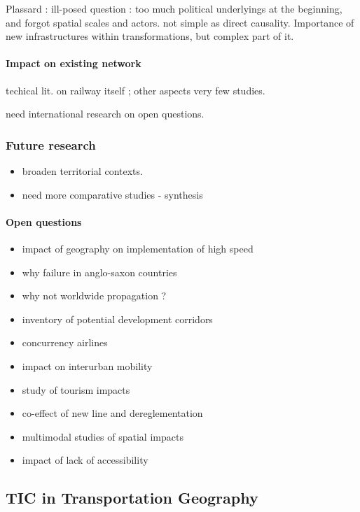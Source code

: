 Plassard : ill-posed question : too much political underlyings at the beginning, and forgot spatial scales and actors. not simple as direct causality. Importance of new infrastructures within transformations, but complex part of it.

\paragraph{Impact on existing network}

techical lit. on railway itself ; other aspects very few studies.

need international research on open questions.

\subsubsection{Future research}

\begin{itemize}
\item broaden territorial contexts.
\item need more comparative studies - synthesis
\end{itemize}

\paragraph{Open questions}

\begin{itemize}
\item impact of geography on implementation of high speed
\item why failure in anglo-saxon countries
\item why not worldwide propagation ?
\item inventory of potential development corridors
\item concurrency airlines
\item impact on interurban mobility
\item study of tourism impacts
\item co-effect of new line and dereglementation
\item multimodal studies of spatial impacts
\item impact of lack of accessibility
\end{itemize}




\subsection{TIC in Transportation Geography}

